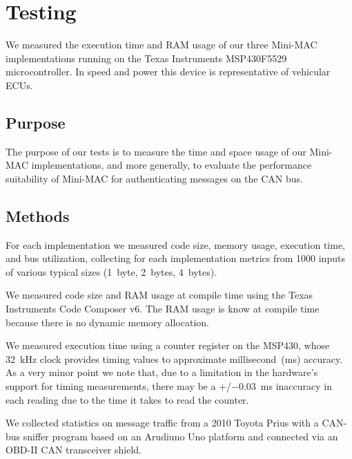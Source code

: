 \section{Testing}
\label{testing}

We measured the execution time and RAM usage of our three Mini-MAC implementations 
running on the Texas Instruments MSP430F5529 microcontroller. 
In speed and power this device is representative of vehicular ECUs.

\subsection{Purpose}
\label{purpose}

The purpose of our tests is to measure the time and space usage of our Mini-MAC implementations, and more generally,
to evaluate the performance suitability of Mini-MAC for authenticating messages on the CAN bus.

\subsection{Methods}
\label{methods}

For each implementation we measured code size, memory usage, execution time, and bus utilization,
collecting for each implementation metrics from 1000 inputs of various typical sizes (1~byte, 2~bytes, 4~bytes).  

We measured code size and RAM usage at compile time using 
the Texas Instruments Code Composer v6.
The RAM usage is know at compile time because there is no
dynamic memory allocation.

We measured execution time using a counter register on the MSP430, 
whose 32~kHz clock provides timing values to approximate millisecond~(ms) accuracy. 
As a very minor point we note that, due to a limitation in the hardware's
support for timing measurements, 
there may be a +/$-$0.03~ms inaccuracy in each reading due to the
time it takes to read the counter.

We collected statistics on message traffic from a 2010 Toyota Prius with a CAN-bus sniffer program 
based on an Arudiuno Uno platform and connected via an OBD-II CAN transceiver shield.

%

